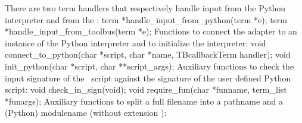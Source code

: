 There are two term handlers that respectively handle input from the
Python interpreter and from the \TB:
\nwenddocs{}\endmoddef\let\nwnotused=\nwoutput{}\nwstartdeflinemarkup{}\nwenddeflinemarkup
term *handle_input_from_python(term *e);
term *handle_input_from_toolbus(term *e);
\nwendcode{}\nwdocspar
Functions to connect the adapter to an instance of the Python
interpreter and to initialize the interpreter:
\nwenddocs{}\plusendmoddef\let\nwnotused=\nwoutput{}\nwstartdeflinemarkup{}\nwenddeflinemarkup
void connect_to_python(char *script, char *name, TBcallbackTerm handler);
void init_python(char *script, char **script_args);
\nwendcode{}\nwdocspar
Auxiliary functions to check the input signature of the \TB\ script 
against the signature of the user defined Python script:
\nwenddocs{}\plusendmoddef\let\nwnotused=\nwoutput{}\nwstartdeflinemarkup{}\nwenddeflinemarkup
void check_in_sign(void);
void require_fun(char *funname, term_list *funargs);
\nwendcode{}\nwdocspar
Auxiliary functions to split a full filename into a pathname and a 
(Python) modulename (without extension ):
\nwenddocs{}\plusendmoddef\let\nwnotused=\nwoutput{}\nwstartdeflinemarkup{}\nwenddeflinemarkup

